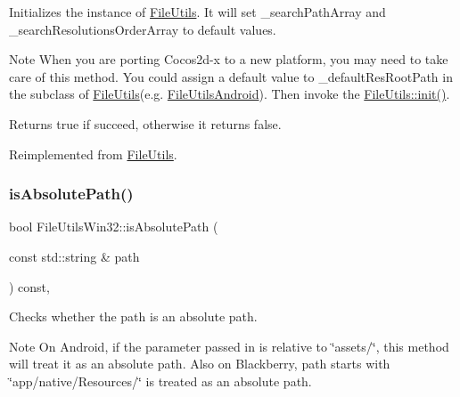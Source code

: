 Initializes the instance of \hyperlink{classFileUtils}{File\+Utils}. It will set \+\_\+search\+Path\+Array and \+\_\+search\+Resolutions\+Order\+Array to default values.

\begin{DoxyNote}{Note}
When you are porting Cocos2d-\/x to a new platform, you may need to take care of this method. You could assign a default value to \+\_\+default\+Res\+Root\+Path in the subclass of \hyperlink{classFileUtils}{File\+Utils}(e.\+g. \hyperlink{classFileUtilsAndroid}{File\+Utils\+Android}). Then invoke the \hyperlink{classFileUtils_a2c891e99dc7af7343f4f9e8d4798a563}{File\+Utils\+::init()}. 
\end{DoxyNote}
\begin{DoxyReturn}{Returns}
true if succeed, otherwise it returns false. 
\end{DoxyReturn}


Reimplemented from \hyperlink{classFileUtils_a2c891e99dc7af7343f4f9e8d4798a563}{File\+Utils}.

\mbox{\label{classFileUtilsWin32_a3427cbefa54f21aedd22ef5253a3bb46}} 
\subsubsection{\texorpdfstring{is\+Absolute\+Path()}{isAbsolutePath()}\hspace{0.1cm}{\footnotesize\ttfamily [1/2]}}
{\footnotesize\ttfamily bool File\+Utils\+Win32\+::is\+Absolute\+Path (\begin{DoxyParamCaption}\item[{const std\+::string \&}]{path }\end{DoxyParamCaption}) const\hspace{0.3cm}{\ttfamily [override]}, {\ttfamily [virtual]}}

Checks whether the path is an absolute path.

\begin{DoxyNote}{Note}
On Android, if the parameter passed in is relative to \char`\"{}assets/\char`\"{}, this method will treat it as an absolute path. Also on Blackberry, path starts with \char`\"{}app/native/\+Resources/\char`\"{} is treated as an absolute path.
\end{DoxyNote}

